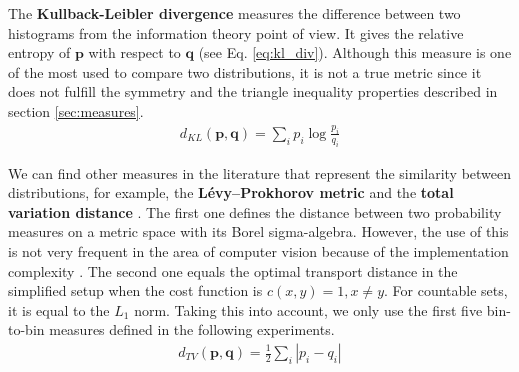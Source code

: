 The \textbf{Kullback-Leibler divergence} \citep{Kullback.Leibler:IMS:1951}  measures the difference between two histograms from the information theory point of view. It gives the relative entropy of $\mathbf{p}$ with respect to $\mathbf{q}$ (see Eq. \ref{eq:kl_div}). Although this measure is one of the most used to compare two distributions, it is not a true metric since it does not fulfill the symmetry and the triangle inequality properties described in section \ref{sec:measures}.
\begin{eqnarray}
d_{KL}(\mathbf{p}, \mathbf{q}) = \sum\nolimits_{i}p_i \log\frac{p_i}{q_i} \label{eq:kl_div}
\end{eqnarray}

We can find other measures in the literature that represent the similarity between distributions, for example, the \textbf{Lévy–Prokhorov metric} \citep{Prokhorov:TPA:1956} and the \textbf{total variation distance} \citep{Bogachev.Kolesnikov:RMS:2012}. The first one defines the distance between two probability measures on a metric space with its Borel sigma-algebra. However, the use of this is not very frequent in the area of computer vision because of the implementation complexity \citep{Bogachev.Kolesnikov:RMS:2012}. The second one equals the optimal transport distance \citep{Cuturi.Avis:JMLR:2011} in the simplified setup when the cost function is $c(x,y)=1, x\neq y$. For countable sets, it is equal to the $L_1$ norm. Taking this into account, we only use the first five bin-to-bin measures defined in the following experiments.
\begin{eqnarray}
d_{TV}(\mathbf{p}, \mathbf{q}) = \frac{1}{2}\sum\nolimits_{i}|p_i - q_i | \label{eq:tv_dist}
\end{eqnarray}


